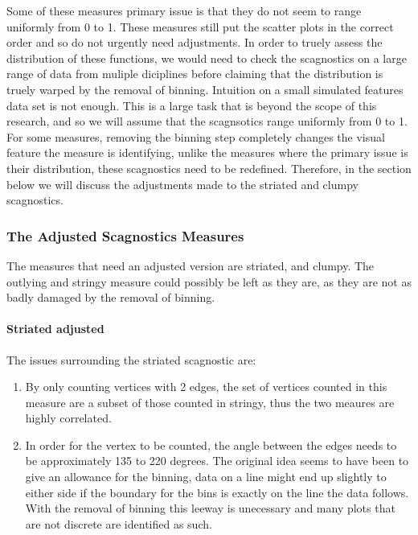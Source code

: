 Some of these measures primary issue is that they do not seem to range
uniformly from 0 to 1. These measures still put the scatter plots in the
correct order and so do not urgently need adjustments. In order to
truely assess the distribution of these functions, we would need to
check the scagnostics on a large range of data from muliple diciplines
before claiming that the distribution is truely warped by the removal of
binning. Intuition on a small simulated features data set is not enough.
This is a large task that is beyond the scope of this research, and so
we will assume that the scagnsotics range uniformly from 0 to 1. For
some measures, removing the binning step completely changes the visual
feature the measure is identifying, unlike the measures where the
primary issue is their distribution, these scagnostics need to be
redefined. Therefore, in the section below we will discuss the
adjustments made to the striated and clumpy scagnostics.

\hypertarget{the-adjusted-scagnostics-measures}{%
\subsubsection{The Adjusted Scagnostics
Measures}\label{the-adjusted-scagnostics-measures}}

The measures that need an adjusted version are striated, and clumpy. The
outlying and stringy measure could possibly be left as they are, as they
are not as badly damaged by the removal of binning.

\hypertarget{striated-adjusted}{%
\paragraph{Striated adjusted}\label{striated-adjusted}}

The issues surrounding the striated scagnostic are:

\begin{enumerate}
\def\labelenumi{\arabic{enumi}.}
\item
  By only counting vertices with 2 edges, the set of vertices counted in
  this measure are a subset of those counted in stringy, thus the two
  meaures are highly correlated.
\item
  In order for the vertex to be counted, the angle between the edges
  needs to be approximately 135 to 220 degrees. The original idea seems
  to have been to give an allowance for the binning, data on a line
  might end up slightly to either side if the boundary for the bins is
  exactly on the line the data follows. With the removal of binning this
  leeway is unecessary and many plots that are not discrete are
  identified as such.
\end{enumerate}

